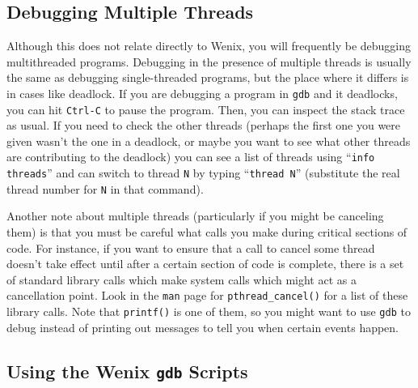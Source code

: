 \subsection{Debugging Multiple Threads}

Although this does not relate directly to Wenix, you will frequently be debugging multithreaded programs. Debugging in the presence of multiple threads is usually the same as debugging single-threaded programs, but the place where it differs is in cases like deadlock. If you are debugging a program in \texttt{gdb} and it deadlocks, you can hit \texttt{Ctrl-C} to pause the program. Then, you can inspect the stack trace as usual. If you need to check the other threads (perhaps the first one you were given wasn't the one in a deadlock, or maybe you want to see what other threads are contributing to the deadlock) you can see a list of threads using ``\texttt{info threads}'' and can switch to thread \texttt{N} by typing ``\texttt{thread N}'' (substitute the real thread number for \texttt{N} in that command).

Another note about multiple threads (particularly if you might be canceling them) is that you must be careful what calls you make during critical sections of code. For instance, if you want to ensure that a call to cancel some thread doesn't take effect until after a certain section of code is complete, there is a set of standard library calls which make system calls which might act as a cancellation point. Look in the \texttt{man} page for \texttt{pthread\_cancel()} for a list of these library calls. Note that \texttt{printf()} is one of them, so you might want to use \texttt{gdb} to debug instead of printing out messages to tell you when certain events happen.

\subsection{Using the Wenix \texttt{gdb} Scripts}

